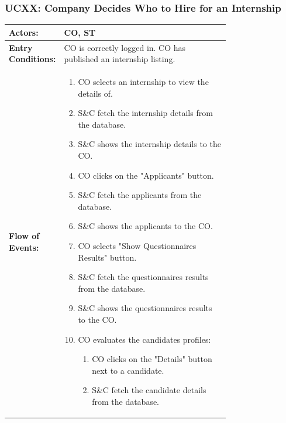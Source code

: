 
\subsubsection{UCXX: Company Decides Who to Hire for an Internship}
\label{subsubsec:company-decides-who-to-hire-for-an-internship}

\begin{center}
    \begin{longtable}{|l|p{0.75\linewidth}|}
        \hline
        \textbf{Actors:}           & CO, ST                                                                                  \\
        \hline
        \textbf{Entry Conditions:} & CO is correctly logged in. CO has published an internship listing.                      \\
        \hline
        \textbf{Flow of Events:}   & \begin{enumerate}
                                         \item CO selects an internship to view the details of.
                                         \item S\&C fetch the internship details from the database.
                                         \item S\&C shows the internship details to the CO.
                                         \item CO clicks on the "Applicants" button.
                                         \item S\&C fetch the applicants from the database.
                                         \item S\&C shows the applicants to the CO.
                                         \item CO selects "Show Questionnaires Results" button.
                                         \item S\&C fetch the questionnaires results from the database.
                                         \item S\&C shows the questionnaires results to the CO.
                                         \item CO evaluates the candidates profiles:
                                               \begin{enumerate}
                      \item CO clicks on the "Details" button next to a candidate.
                      \item S\&C fetch the candidate details from the database.

\end{enumerate}
\end{enumerate}
\end{longtable}
\end{center}
